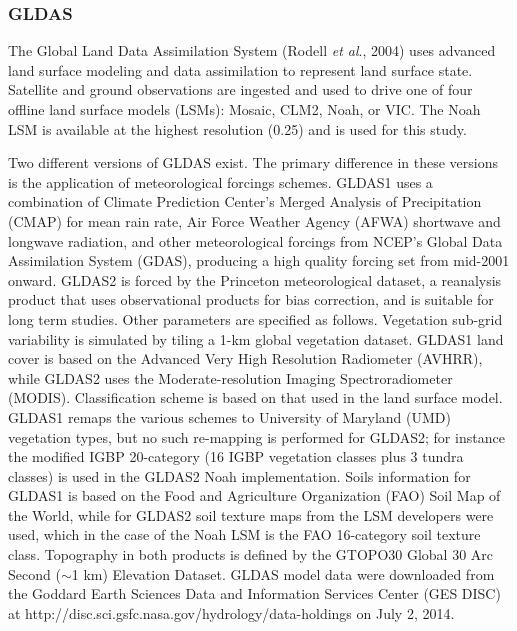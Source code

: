 \documentclass[12pt]{article}
\begin{document}
\subsubsection{GLDAS}
The Global Land Data Assimilation System (Rodell \textit{et al}., 2004) uses advanced land surface modeling and data assimilation to represent land surface state.  Satellite and ground observations are ingested and used to drive one of four offline land surface models (LSMs): Mosaic, CLM2, Noah, or VIC.  The Noah LSM is available at the highest resolution (0.25\textdegree) and is used for this study.

Two different versions of GLDAS exist.  The primary difference in these versions is the application of meteorological forcings schemes.  GLDAS1 uses a combination of Climate Prediction Center's Merged Analysis of Precipitation (CMAP) for mean rain rate, Air Force Weather Agency (AFWA) shortwave and longwave radiation, and other meteorological forcings from NCEP's Global Data Assimilation System (GDAS), producing a high quality forcing set from mid-2001 onward.  GLDAS2 is forced by the Princeton meteorological dataset, a reanalysis product that uses observational products for bias correction, and is suitable for long term studies.  Other parameters are specified as follows.  Vegetation sub-grid variability is simulated by tiling a 1-km global vegetation dataset.  GLDAS1 land cover is based on the Advanced Very High Resolution Radiometer (AVHRR), while GLDAS2 uses the Moderate-resolution Imaging Spectroradiometer (MODIS).  Classification scheme is based on that used in the land surface model.  GLDAS1 remaps the various schemes to University of Maryland (UMD) vegetation types, but no such re-mapping is performed for GLDAS2; for instance the modified IGBP 20-category (16 IGBP vegetation classes plus 3 tundra classes) is used in the GLDAS2 Noah implementation.  Soils information for GLDAS1 is based on the Food and Agriculture Organization (FAO) Soil Map of the World, while for GLDAS2 soil texture maps from the LSM developers were used, which in the case of the Noah LSM is the FAO 16-category soil texture class.  Topography in both products is defined by the GTOPO30 Global 30 Arc Second ($\sim$1 km) Elevation Dataset.  GLDAS model data were downloaded from the Goddard Earth Sciences Data and Information Services Center (GES DISC) at http://disc.sci.gsfc.nasa.gov/hydrology/data-holdings on July 2, 2014.
\end{document}
